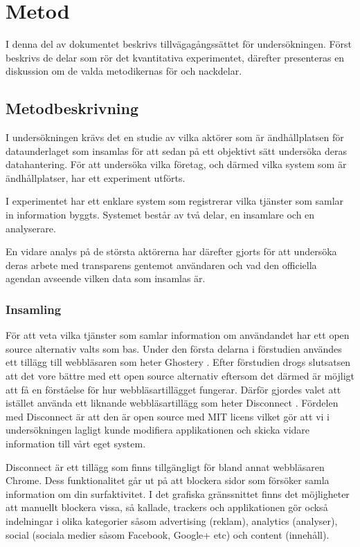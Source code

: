 \documentclass[a4paper,11pt]{article}
\begin{document}
{\section{Metod}
I denna del av dokumentet beskrivs tillvägagångssättet för undersökningen. Först beskrivs de delar som rör det kvantitativa experimentet, därefter presenteras en diskussion om de valda metodikernas för och nackdelar. 

\subsection{Metodbeskrivning}
I undersökningen krävs det en studie av vilka aktörer som är ändhållplatsen för dataunderlaget som insamlas för att sedan på ett objektivt sätt undersöka deras datahantering. För att undersöka vilka företag, och därmed vilka system som är ändhållplatser, har ett experiment utförts.

I experimentet har ett enklare system som registrerar vilka tjänster som samlar in information byggts. Systemet består av två delar, en insamlare och  en analyserare. 

En vidare analys på de största aktörerna har därefter gjorts för att undersöka deras arbete med transparens gentemot användaren och vad den officiella agendan avseende vilken data som insamlas är. 

\subsubsection{Insamling}
För att veta vilka tjänster som samlar information om användandet har ett open source alternativ valts som bas. Under den första delarna i förstudien användes ett tillägg till webbläsaren som heter Ghostery \cite{Ghostery}. Efter förstudien drogs slutsatsen att det vore bättre med ett open source alternativ eftersom det därmed är möjligt att få en förståelse för hur webbläsartillägget fungerar. Därför gjordes valet att istället använda ett liknande webbläsartillägg som heter Disconnect \cite{Disconnect}. Fördelen med Disconnect är att den är open source med MIT \cite{MIT} licens vilket gör att vi i undersökningen lagligt kunde modifiera applikationen och skicka vidare information till vårt eget system. 

Disconnect är ett tillägg som finns tillgängligt för bland annat webbläsaren Chrome. Dess funktionalitet går ut på att blockera sidor som försöker samla information om din surfaktivitet. I det grafiska gränssnittet finns det möjligheter att manuellt blockera vissa, så kallade, trackers och applikationen gör också indelningar i olika kategorier såsom advertising (reklam), analytics (analyser), social (sociala medier såsom Facebook, Google+ etc) och content (innehåll). 

}
\end{document}
